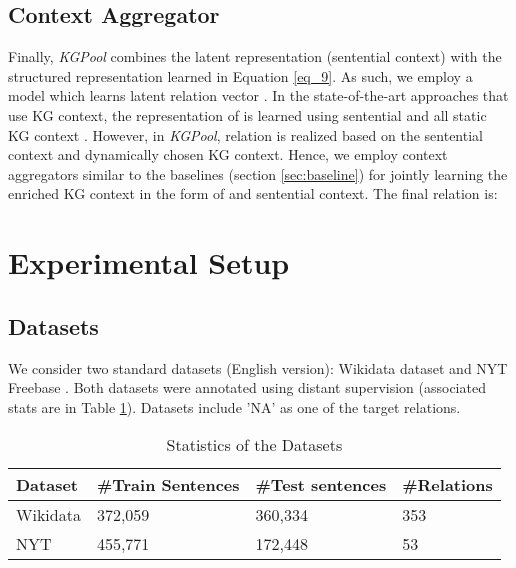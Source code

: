 \documentclass[11pt,a4paper]{article}
\begin{document}
\subsection{Context Aggregator}  \label{sec:aggregator}
Finally, \textit{KGPool} combines the latent representation (sentential context) with the structured representation learned in Equation \ref{eq_9}. As such, we employ a model  which learns latent
relation vector . In the state-of-the-art approaches that use KG context, the representation of  is learned using sentential and all static KG context \cite{DBLP:conf/emnlp/VashishthJPBT18,bastos2020recon}. However, in \textit{KGPool}, relation  is realized based on the sentential context and dynamically chosen KG context. Hence, we employ context aggregators similar to the baselines (section \ref{sec:baseline}) for jointly learning the enriched KG context in the form of  and sentential context. 
The final relation is:





\section{Experimental Setup} \label{sec:experiment}
\subsection{Datasets}
We consider two standard datasets (English version): Wikidata dataset \cite{DBLP:conf/emnlp/SorokinG17} and NYT Freebase \cite{DBLP:conf/pkdd/RiedelYM10}. 
Both datasets were annotated using distant supervision (associated stats are in Table \ref{tab:dataset}). 
Datasets include 'NA' as one of the target relations. 
\begin{table}[h]

   \centering
   \begin{tabular}{p{1.2cm}|p{1.4cm}|p{1.5cm}|p{1.2cm}}
      \toprule
       \textbf{Dataset} & \textbf{\#Train Sentences} & \textbf{\#Test sentences} & \textbf{\#Relations} \\
       \midrule
       Wikidata  & 372,059  & 360,334 & 353  \\
        \midrule
       NYT & 455,771 & 172,448 & 53 \\
        \bottomrule
    \end{tabular}
    \caption{Statistics of the Datasets}
    \label{tab:dataset}
\end{table}
\end{document}
